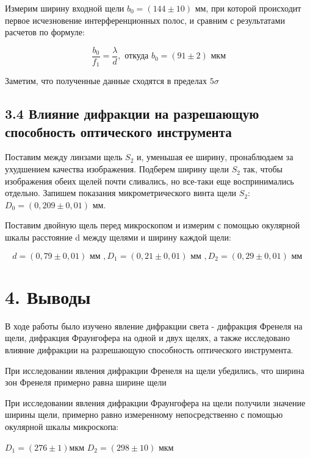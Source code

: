 \documentclass[a4paper,12pt]{report}
\begin{document}
Измерим ширину входной щели $b_{0} = (144 \pm 10)$ мм, при которой происходит первое исчезновение интерференционных полос, и сравним с результатами расчетов по формуле:

\begin{equation}
\frac{b_{0}}{f_{1}} = \frac{\lambda}{d}, \text{ откуда } b_{0} = (91 \pm 2) \text{ мкм}
\end{equation}

Заметим, что полученные данные сходятся в пределах $5\sigma$

\subsection*{3.4 Влияние дифракции на разрешающую способность оптического инструмента}

Поставим между линзами щель $S_{2}$ и, уменьшая ее ширину, пронаблюдаем за ухудшением качества изображения. Подберем ширину  щели $S_{2}$ так, чтобы изображения обеих щелей почти сливались, но все-таки еще воспринимались отдельно. Запишем показания микрометрического винта щели $S_{2}$: $D_{0} = (0,209 \pm 0,01)$ мм.

Поставим двойную щель перед микроскопом и измерим с помощью окулярной шкалы расстояние d между щелями и ширину каждой щели:

\begin{equation}
d = (0,79 \pm 0,01) \text{ мм }, D_{1} = (0,21\pm 0,01)\text{ мм }, D_{2} = (0,29\pm 0,01)\text{ мм }
\end{equation}

\section*{4. Выводы}

В ходе работы было изучено явление дифракции света - дифракция Френеля на щели, дифракция Фраунгофера на одной и двух щелях, а также исследовано влияние дифракции на разрешающую способность оптического инструмента.

При исследовании явления дифракции Френеля на щели убедились, что ширина зон Френеля примерно равна ширине щели
    
При исследовании явления дифракции Фраунгофера на щели получили значение ширины щели, примерно равно измеренному непосредственно с помощью окулярной шкалы микроскопа:
\begin{center}
 $D_{1} = (276\pm 1) $мкм \hspace{1cm} $D_{2} = (298\pm 10)$ мкм
\end{center}
    
\end{document}
